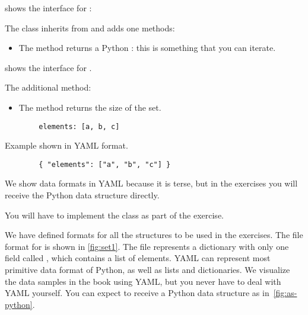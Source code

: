  shows the interface for \EnumerableSet:


The class inherits from \Setoid and adds one methods:
\begin{itemize}
    \item The method  returns a Python \Iterator: this is something that you can iterate.
\end{itemize}
 shows the interface for \FiniteSet.


The additional method:
\begin{itemize}
    \item The method  returns the size of the set.
\end{itemize}

\begin{marginfigure}
    \begin{verbatim}
        elements: [a, b, c]
    \end{verbatim}
    \caption{Example shown in YAML format.}
    \label{fig:set1}
\end{marginfigure}

\begin{marginfigure}
    \begin{verbatim}
        { "elements": ["a", "b", "c"] }
    \end{verbatim}
    \caption{We show data formats in YAML because it is terse, but in the exercises you will receive the Python data structure directly.}
    \label{fig:as-python}
\end{marginfigure}

You will have to implement the \FiniteSet class as part of the exercise.


We have defined formats for all the structures to be used in the exercises.
The file format for \FiniteSet is shown in \cref{fig:set1}.
The file represents a dictionary with only one field called , which contains a list of elements.
YAML can represent most primitive data format of Python, as well as lists and dictionaries.
We visualize the data samples in the book using YAML, but you never have to deal with YAML yourself.
You can expect to receive a Python data structure as in~\cref{fig:as-python}.

